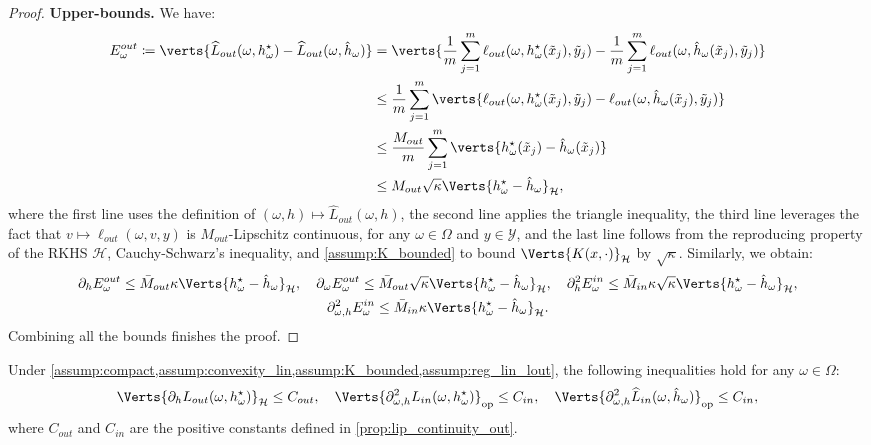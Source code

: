 \begin{proof}
\textbf{Upper-bounds. }We have:
\begin{align*}
    \Eout\coloneqq\verts{\widehat{L}_{out}(\omega, h^\star_\omega)-\widehat{L}_{out}(\omega, \hat{h}_\omega)}&=\verts{\frac{1}{m}\sum_{j=1}^m\ell_{out}(\omega, h^\star_\omega(\tilde{x}_j), \tilde{y}_j) - \frac{1}{m}\sum_{j=1}^m\ell_{out}(\omega, \hat{h}_\omega(\tilde{x}_j), \tilde{y}_j)}\\
    &\leq\frac{1}{m}\sum_{j=1}^m\verts{\ell_{out}(\omega, h^\star_\omega(\tilde{x}_j), \tilde{y}_j)-\ell_{out}(\omega, \hat{h}_\omega(\tilde{x}_j), \tilde{y}_j)}\\
    &\leq\frac{M_{out}}{m}\sum_{j=1}^m\verts{h^\star_\omega(\tilde{x}_j)-\hat{h}_\omega(\tilde{x}_j)}\\
    &\leq M_{out}\sqrt{\kappa}\Verts{h^\star_\omega-\hat{h}_\omega}_\mathcal{H},
\end{align*}
where the first line uses the definition of $(\omega, h)\mapsto\widehat{L}_{out}(\omega, h)$, the second line applies the triangle inequality, the third line leverages the fact that $v\mapsto\ell_{out}(\omega, v, y)$ is $M_{out}$-Lipschitz continuous, for any $\omega\in\Omega$ and $y\in\mathcal{Y}$, and the last line follows from the reproducing property of the RKHS $\mathcal{H}$, Cauchy-Schwarz's inequality, and \cref{assump:K_bounded} to bound $\Verts{K(x,\cdot)}_\mathcal{H}$ by $\sqrt{\kappa}$. Similarly, we obtain:
\begin{gather*}
    \partial_h\Eout\leq\bar{M}_{out}\kappa\Verts{h^\star_\omega-\hat{h}_\omega}_\mathcal{H},\quad\partial_\omega\Eout\leq\bar{M}_{out} \sqrt{\kappa}\Verts{h^\star_\omega-\hat{h}_\omega}_\mathcal{H},\quad\partial_h^2\Ein\leq\bar{M}_{in} \kappa\sqrt{\kappa}\Verts{h^\star_\omega-\hat{h}_\omega}_\mathcal{H},\\
    \partial_{\omega, h}^2\Ein\leq\bar{M}_{in} \kappa\Verts{h^\star_\omega-\hat{h}_\omega}_\mathcal{H}.
\end{gather*}
Combining all the bounds finishes the proof.
\end{proof}

\begin{proposition}\label{prop:bounded_derivatives}
Under \cref{assump:compact,assump:convexity_lin,assump:K_bounded,assump:reg_lin_lout}, the following inequalities hold for any $\omega\in\Omega$:
\begin{align*}
	\Verts{\partial_{h}L_{out}(\omega,h_{\omega}^{\star})}_{\mathcal{H}}\leq C_{out}, \quad \Verts{\partial^2_{\omega,h}L_{in}(\omega,h_{\omega}^{\star}) }_{\op}\leq C_{in},\quad 
	\Verts{\partial^2_{\omega,h}\widehat{L}_{in}(\omega,\hat{h}_{\omega}) }_{\op}\leq C_{in},
\end{align*}
where $C_{out}$ and $C_{in}$ are the positive constants defined in \cref{prop:lip_continuity_out}.
\end{proposition}

